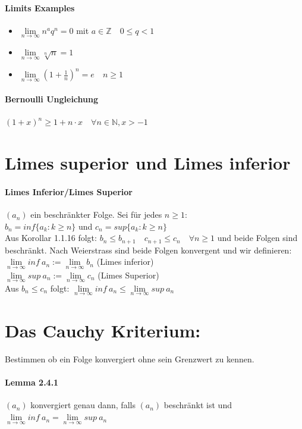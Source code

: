 \documentclass[8pt]{extreport}
\begin{document}
\paragraph{Limits Examples}
\begin{itemize}
\item $\lim\limits_{n \to \infty} n^a q^n = 0 $ mit $a\in \mathbb{Z} \quad 0\leq q < 1$ 
\item $\lim\limits_{n \to \infty} \sqrt[n]{n} = 1$
\item $ \lim\limits_{n \to \infty} (1 + \frac {1}{n})^n = \mathit{e} \quad n \geq 1$
\end{itemize}
\paragraph{Bernoulli Ungleichung} $(1+x)^n \geq 1 + n\cdot x \quad \forall n \in \mathbb{N}, x > -1$
\section{Limes superior und Limes inferior}
\paragraph{Limes Inferior/Limes Superior} $(a_{n})$ ein beschränkter Folge. Sei für jedes $n\geq1:$\\
$b_{n} = inf\{a_{k} : k\geq n\}$ und $c_{n} = sup\{a_{k}: k \geq n \}$ \\
Aus Korollar 1.1.16 folgt: $b_{n} \leq b_{n+1} \quad c_{n+1} \leq c_{n} \quad \forall n\geq 1$ und beide Folgen sind beschränkt. Nach Weierstrass sind beide Folgen konvergent und wir definieren:\\
$\lim\limits_{n \to \infty} inf  \ a_{n} := \lim\limits_{n \to \infty} b_{n}$ (Limes inferior)\\
$\lim\limits_{n \to \infty} sup \ a_{n} := \lim\limits_{n \to \infty} c_{n}$ (Limes Superior)\\
Aus $b_{n} \leq c_{n}$ folgt:    $\lim\limits_{n \to \infty} inf  \ a_{n} \leq \lim\limits_{n \to \infty} sup \ a_{n}$
\section{Das Cauchy Kriterium: } Bestimmen ob ein Folge konvergiert ohne sein Grenzwert zu kennen.
\paragraph{Lemma 2.4.1} $(a_{n})$ konvergiert genau dann, falls $(a_{n})$ beschränkt ist und $\lim\limits_{n\to \infty} inf \ a_{n} = \lim\limits_{n \to \infty} sup \ a_{n}$
\end{document}

